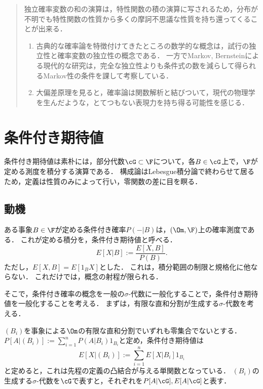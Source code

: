 \documentclass[uplatex,dvipdfmx]{jsreport}
\begin{document}
\begin{quotation}
    独立確率変数の和の演算は，特性関数の積の演算に写されるため，分布が不明でも特性関数の性質から多くの摩訶不思議な性質を持ち還ってくることが出来る．
    \begin{enumerate}
        \item 古典的な確率論を特徴付けてきたところの数学的な概念は，試行の独立性と確率変数の独立性の概念である．
        一方でMarkov, Bernsteinによる現代的な研究は，完全な独立性よりも条件式の数を減らして得られるMarkov性の条件を課して考察している．
        \item 大偏差原理を見ると，確率論は関数解析と結びついて，現代の物理学を生んだような，とてつもない表現力を持ち得る可能性を感じる．
    \end{enumerate}
\end{quotation}

\section{条件付き期待値}

\begin{tcolorbox}[colframe=ForestGreen, colback=ForestGreen!10!white,breakable,colbacktitle=ForestGreen!40!white,coltitle=black,fonttitle=\bfseries\sffamily,
    title=]
    条件付き期待値は素朴には，部分代数$\cG\subset\F$について，各$B\in\cG$上で，$\F$が定める測度を積分する演算である．
    構成論はLebesgue積分論で終わらせて居るため，定義は性質のみによって行い，零関数の差に目を瞑る．
\end{tcolorbox}

\subsection{動機}

\begin{discussion}[事象の条件付き確率が定める条件付き期待値]
    ある事象$B\in\F$が定める条件付き確率$P(-|B)$は，$(\Om,\F)$上の確率測度である．
    これが定める積分を，条件付き期待値と呼べる．
    \[E[X|B]:=\frac{E[X,B]}{P(B)}.\]
    ただし，$E[X,B]=E[1_BX]$とした．
    これは，積分範囲の制限と規格化に他ならない．
    これだけでは，概念の射程が限られる．
\end{discussion}

\begin{discussion}[条件付き確率の一般化]
    そこで，条件付き確率の概念を一般の$\sigma$-代数に一般化することで，条件付き期待値を一般化することを考える．
    まずは，有限な直和分割が生成する$\sigma$-代数を考える．

    $(B_i)$を事象による$\Om$の有限な直和分割でいずれも零集合でないとする．
    $P[A|(B_i)]:=\sum^n_{i=1}P(A|B_i)1_{B_i}$と定め，条件付き期待値は
    \[E[X|(B_i)]:=\sum_{i=1}^nE[X|B_i]1_{B_i}\]
    と定めると，これは先程の定義の凸結合が与える単関数となっている．
    $(B_i)$の生成する$\sigma$-代数を$\cG$で表すと，それぞれを$P[A|\cG],E[A|\cG]$と表す．
\end{discussion}
\end{document}
